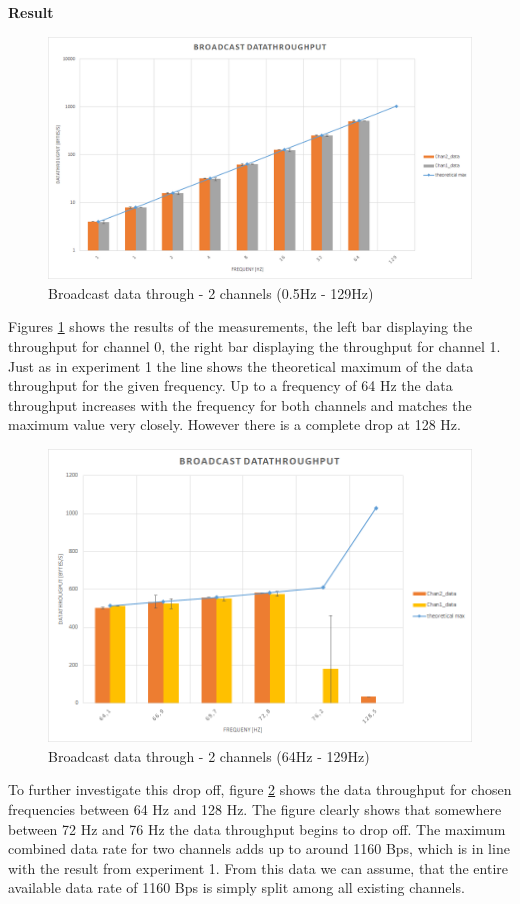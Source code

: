 \begin{description}
	\item{\textbf{Result}} \hfill \\  	
	\begin{figure}[H]
		\centering
		\includegraphics[scale=0.5]{content/images/exp2_norm.png}
		\caption{Broadcast data through - 2 channels (0.5Hz - 129Hz)}\label{fig:exp2low}
	\end{figure}
	Figures \ref{fig:exp2low} shows the results of the measurements, the left bar displaying the throughput for channel 0, the right bar displaying the throughput for channel 1. Just as in experiment 1 the  line shows the theoretical maximum of the data throughput for the given frequency. Up to a frequency of 64 Hz the data throughput increases with the frequency for both channels and matches the maximum value very closely. However there is a complete drop at 128 Hz.
		\begin{figure}[H]
			\centering
			\includegraphics[scale=0.5]{content/images/exp2_detail.png}
			\caption{Broadcast data through - 2 channels (64Hz - 129Hz)}\label{fig:exp2high}
		\end{figure}
	To further investigate this drop off, figure \ref{fig:exp2high} shows the data throughput for chosen frequencies between 64 Hz and 128 Hz. The figure clearly shows that somewhere between 72 Hz and 76 Hz the data throughput begins to drop off. The maximum combined data rate for two channels adds up to around 1160 Bps, which is in line with the result from experiment 1. From this data we can assume, that the entire available data rate of 1160 Bps is simply split among all existing channels.
\end{description}
\newpage


